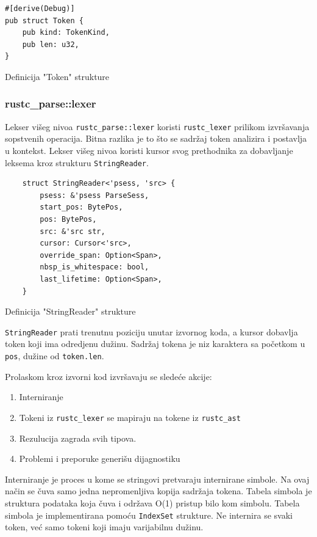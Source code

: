 \documentclass[11pt]{article}
\begin{document}
\begin{listing}[H]
\begin{verbatim}
#[derive(Debug)]
pub struct Token {
    pub kind: TokenKind,
    pub len: u32,
}   
\end{verbatim}
\caption{Definicija "Token" strukture}
\end{listing}

\newpage
\subsubsection{rustc\_parse::lexer}

Lekser višeg nivoa \verb|rustc_parse::lexer| koristi \verb|rustc_lexer| prilikom izvršavanja sopstvenih
operacija. Bitna razlika je to što se sadržaj token analizira i postavlja u kontekst.
Lekser višeg nivoa koristi kursor svog prethodnika za dobavljanje leksema kroz strukturu \verb|StringReader|. 

\begin{listing}[H]
\begin{verbatim}
    struct StringReader<'psess, 'src> {
        psess: &'psess ParseSess,
        start_pos: BytePos,
        pos: BytePos,
        src: &'src str,
        cursor: Cursor<'src>,
        override_span: Option<Span>,
        nbsp_is_whitespace: bool,
        last_lifetime: Option<Span>,
    }
\end{verbatim}
\caption{Definicija "StringReader" strukture}
\end{listing}
\verb|StringReader| prati trenutnu poziciju unutar izvornog koda, a kursor 
dobavlja token koji ima odredjenu dužinu. Sadržaj tokena je niz karaktera sa početkom u \verb|pos|,
dužine od \verb|token.len|. 

Prolaskom kroz izvorni kod izvršavaju se sledeće akcije:
\begin{enumerate}
    \item Interniranje 
    \item Tokeni iz \verb|rustc_lexer| se mapiraju na tokene iz \verb|rustc_ast|
    \item Rezulucija zagrada svih tipova.
    \item Problemi i preporuke generišu dijagnostiku 
\end{enumerate}

Interniranje je proces u kome se stringovi pretvaraju internirane simbole. Na ovaj način
se čuva samo jedna nepromenljiva kopija sadržaja tokena. Tabela simbola je struktura podataka
koja čuva i održava O(1) pristup bilo kom simbolu.  Tabela simbola je implementirana pomoću \verb|IndexSet|
strukture. Ne internira se svaki token, već samo tokeni koji imaju varijabilnu dužinu.
\end{document}
